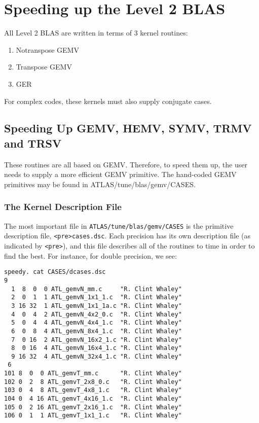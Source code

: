 \documentclass[11pt]{article}
\begin{document}
\section{Speeding up the Level 2 BLAS}

All Level 2 BLAS are written in terms of 3 kernel routines:
\begin{enumerate}
\item Notranspose GEMV
\item Transpose GEMV
\item GER
\end{enumerate}

For complex codes, these kernels must also supply conjugate cases.

\subsection{Speeding Up GEMV, HEMV, SYMV, TRMV and TRSV}
These routines are all based on GEMV.  Therefore, to speed them up, the user
needs to supply a more efficient GEMV primitive.  The hand-coded GEMV
primitives may be found in ATLAS/tune/blas/gemv/CASES.

\subsubsection{The Kernel Description File}
\label{sec-gemvdesc}

The most important file in {\tt ATLAS/tune/blas/gemv/CASES}
is the primitive description
file, \verb+<pre>cases.dsc+.  Each precision has its own description file (as
indicated by \verb+<pre>+), and this file describes all of the routines to
time in order to find the best.  For instance, for double precision, we see:
\begin{verbatim}
speedy. cat CASES/dcases.dsc 
9
  1  8  0  0 ATL_gemvN_mm.c     "R. Clint Whaley"
  2  0  1  1 ATL_gemvN_1x1_1.c  "R. Clint Whaley"
  3 16 32  1 ATL_gemvN_1x1_1a.c "R. Clint Whaley"
  4  0  4  2 ATL_gemvN_4x2_0.c  "R. Clint Whaley"
  5  0  4  4 ATL_gemvN_4x4_1.c  "R. Clint Whaley"
  6  0  8  4 ATL_gemvN_8x4_1.c  "R. Clint Whaley"
  7  0 16  2 ATL_gemvN_16x2_1.c "R. Clint Whaley"
  8  0 16  4 ATL_gemvN_16x4_1.c "R. Clint Whaley"
  9 16 32  4 ATL_gemvN_32x4_1.c "R. Clint Whaley"
 6
101 8  0  0 ATL_gemvT_mm.c      "R. Clint Whaley"
102 0  2  8 ATL_gemvT_2x8_0.c   "R. Clint Whaley"
103 0  4  8 ATL_gemvT_4x8_1.c   "R. Clint Whaley"
104 0  4 16 ATL_gemvT_4x16_1.c  "R. Clint Whaley"
105 0  2 16 ATL_gemvT_2x16_1.c  "R. Clint Whaley"
106 0  1  1 ATL_gemvT_1x1_1.c   "R. Clint Whaley"
\end{verbatim}
\end{document}

